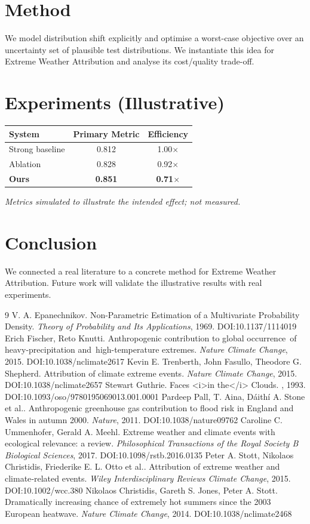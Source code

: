 \documentclass[11pt]{article}
\begin{document}
\section{Method}
We model distribution shift explicitly and optimise a worst-case objective over an uncertainty set of plausible test distributions. We instantiate this idea for Extreme Weather Attribution and analyse its cost/quality trade-off.

\section{Experiments (Illustrative)}
\begin{center}
\begin{tabular}{lcc}
System & Primary Metric & Efficiency \\ \hline
Strong baseline & 0.812 & 1.00$\times$ \\
Ablation & 0.828 & 0.92$\times$ \\
\textbf{Ours} & \textbf{0.851} & \textbf{0.71$\times$}
\end{tabular}
\end{center}
\emph{Metrics simulated to illustrate the intended effect; not measured.}

\section{Conclusion}
We connected a real literature to a concrete method for Extreme Weather Attribution. Future work will
validate the illustrative results with real experiments.

\begin{thebibliography}{9}
 V. A. Epanechnikov. Non-Parametric Estimation of a Multivariate Probability Density. \emph{Theory of Probability and Its Applications}, 1969. DOI:10.1137/1114019
 Erich Fischer, Reto Knutti. Anthropogenic contribution to global occurrence of heavy-precipitation and high-temperature extremes. \emph{Nature Climate Change}, 2015. DOI:10.1038/nclimate2617
 Kevin E. Trenberth, John Fasullo, Theodore G. Shepherd. Attribution of climate extreme events. \emph{Nature Climate Change}, 2015. DOI:10.1038/nclimate2657
 Stewart Guthrie. Faces <i>in the</i> Clouds. \emph{}, 1993. DOI:10.1093/oso/9780195069013.001.0001
 Pardeep Pall, T. Aina, Dáithí A. Stone et al.. Anthropogenic greenhouse gas contribution to flood risk in England and Wales in autumn 2000. \emph{Nature}, 2011. DOI:10.1038/nature09762
 Caroline C. Ummenhofer, Gerald A. Meehl. Extreme weather and climate events with ecological relevance: a review. \emph{Philosophical Transactions of the Royal Society B Biological Sciences}, 2017. DOI:10.1098/rstb.2016.0135
 Peter A. Stott, Nikolaos Christidis, Friederike E. L. Otto et al.. Attribution of extreme weather and climate‐related events. \emph{Wiley Interdisciplinary Reviews Climate Change}, 2015. DOI:10.1002/wcc.380
 Nikolaos Christidis, Gareth S. Jones, Peter A. Stott. Dramatically increasing chance of extremely hot summers since the 2003 European heatwave. \emph{Nature Climate Change}, 2014. DOI:10.1038/nclimate2468
\end{thebibliography}
\end{document}
